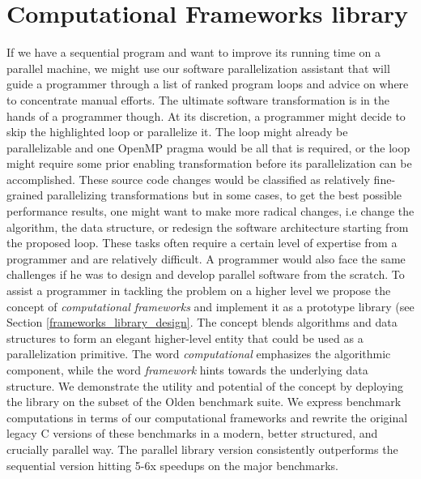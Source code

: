 \section{Computational Frameworks library}
\label{introduction_frameworks}
\quad If we have a sequential program and want to improve its running time on a parallel machine, we might use our software parallelization assistant that will guide a programmer through a list of ranked program loops and advice on where to concentrate manual efforts. The ultimate software transformation is in the hands of a programmer though. At its discretion, a programmer might decide to skip the highlighted loop or parallelize it. The loop might already be parallelizable and one OpenMP pragma would be all that is required, or the loop might require some prior enabling transformation before its parallelization can be accomplished. These source code changes would be classified as relatively fine-grained parallelizing transformations but in some cases, to get the best possible performance results, one might want to make more radical changes, i.e change the algorithm, the data structure, or redesign the software architecture starting from the proposed loop. These tasks often require a certain level of expertise from a programmer and are relatively difficult. A programmer would also face the same challenges if he was to design and develop parallel software from the scratch.\newline\null
\quad To assist a programmer in tackling the problem on a higher level we propose the concept of \textit{computational frameworks} and implement it as a prototype library (see Section \ref{frameworks_library_design}. The concept blends algorithms and data structures to form an elegant higher-level entity that could be used as a parallelization primitive. The word \textit{computational} emphasizes the algorithmic component, while the word \textit{framework} hints towards the underlying data structure. We demonstrate the utility and potential of the concept by deploying the library on the subset of the Olden benchmark suite. We express benchmark computations in terms of our computational frameworks and rewrite the original legacy C versions of these benchmarks in a modern, better structured, and crucially parallel way. The parallel library version consistently outperforms the sequential version hitting 5-6x speedups on the major benchmarks.\newline\null

